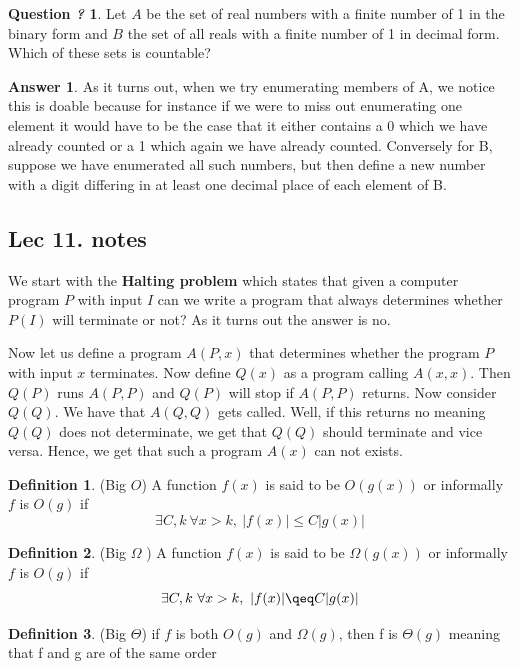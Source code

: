 \documentclass[titlepage]{article}
\theoremstyle{definition}
\newtheorem{definition}{Definition}
\numberwithin{equation}{subsection}
\numberwithin{remark}{subsection}
\newtheorem{question}{Question \textit{?}}[subsection]
\newtheorem{answer}{Answer}[subsection]
\begin{document}
\begin{question}
Let $A$ be the set of real numbers with a finite number of 1 in the binary form and $B$ the set of all reals with a finite number of 1 in decimal form. Which of these sets is countable?
\end{question}
\begin{answer}
As it turns out, when we try enumerating members of A, we notice this is doable because for instance if we were to miss out enumerating one element it would have to be the case that it either contains a 0 which  we have already counted or a 1 which again we have already counted. Conversely for B, suppose we have enumerated all such numbers, but then define a new number with a digit differing in at least one decimal place of each element of B. 
\end{answer}

\subsection{Lec 11. notes}
We start with the \textbf{Halting problem} which states that given a computer program $P$ with input $I$ can we write a program that always determines whether $P(I)$ will terminate or not? As it turns out the answer is no.
\begin{example*}
Now let us define a program $A(P,x)$ that determines whether the program $P$ with input $x$ terminates. Now define $Q(x)$ as a program calling $A(x,x)$. Then $Q(P)$ runs $A(P,P)$ and $Q(P)$ will stop if $A(P,P)$ returns. Now consider $Q(Q)$. We have that $A(Q,Q)$ gets called. Well, if this returns no meaning $Q(Q)$ does not determinate, we get that $Q(Q)$ should terminate and vice versa. Hence, we get that such a program $A(x)$ can not exists. 
\end{example*}

\begin{definition}(Big $O$)
A function $f(x)$ is said to be $O(g(x))$ or informally $f$ is $O(g)$ if $$ \exists C,k \ \forall x>k, \ |f(x)| \leq C|g(x)|$$
\end{definition}


\begin{definition}(Big $\Omega$ )
A function $f(x)$ is said to be $\Omega(g(x))$ or informally $f$ is $O(g)$ if $$ \exists C,k \ \forall x>k, \ |f(x)| \qeq C|g(x)|$$
\end{definition}

\begin{definition}(Big $\Theta$)
if $f$ is both $O(g)$ and $\Omega(g)$, then f is $\Theta(g)$ meaning that f and g are of the same order
\end{definition}
\end{document}
